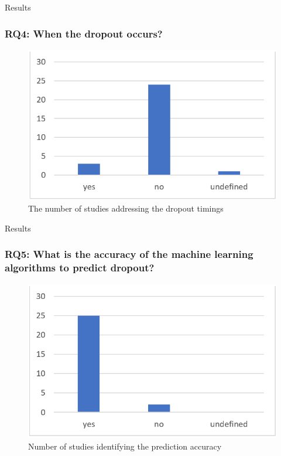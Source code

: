 \documentclass[10pt]{beamer}
\begin{document}
\begin{frame}[fragile]{Results}
	\frametitle{RQ4: When the dropout occurs?}
	\begin{figure}
		\includegraphics[scale=0.5]{../img/dropoutTimings.png}
		\caption{The number of studies addressing the dropout timings}
		\label{figure4}
	\end{figure}
\end{frame}

\begin{frame}[fragile]{Results}
	\frametitle{RQ5: What is the accuracy of the machine learning algorithms to predict dropout?}
	\begin{figure}
		\includegraphics[scale=0.5]{../img/predictionAccuracy.png}
		\caption{Number of studies identifying the prediction accuracy}
		\label{figure3}
	\end{figure}
\end{frame}

\end{document}
